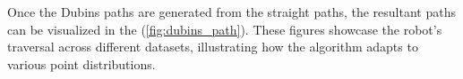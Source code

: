 

\vspace*{6mm}


Once the Dubins paths are generated from the straight paths, the resultant paths can be visualized in the (\autoref{fig:dubins_path}). These figures showcase the robot's traversal across different datasets, illustrating how the algorithm adapts to various point distributions.





